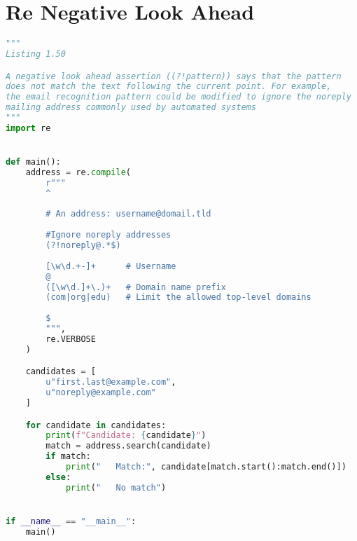 \documentclass[a4paper,landscape]{report}
\begin{document}
\section{Re Negative Look Ahead}
\begin{lstlisting}[language=Python]
"""
Listing 1.50

A negative look ahead assertion ((?!pattern)) says that the pattern
does not match the text following the current point. For example,
the email recognition pattern could be modified to ignore the noreply
mailing address commonly used by automated systems
"""
import re


def main():
    address = re.compile(
        r"""
        ^
        
        # An address: username@domail.tld
        
        #Ignore noreply addresses
        (?!noreply@.*$)
        
        [\w\d.+-]+      # Username
        @
        ([\w\d.]+\.)+   # Domain name prefix
        (com|org|edu)   # Limit the allowed top-level domains
        
        $
        """,
        re.VERBOSE
    )

    candidates = [
        u"first.last@example.com",
        u"noreply@example.com"
    ]

    for candidate in candidates:
        print(f"Candidate: {candidate}")
        match = address.search(candidate)
        if match:
            print("   Match:", candidate[match.start():match.end()])
        else:
            print("   No match")


if __name__ == "__main__":
    main()

\end{lstlisting}
\end{document}
